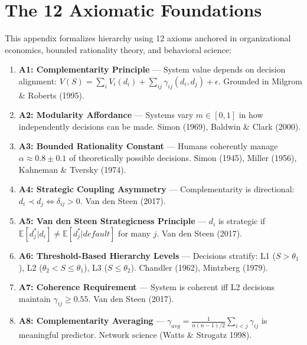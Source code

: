 
\section{The 12 Axiomatic Foundations}

This appendix formalizes hierarchy using 12 axioms anchored in organizational economics, bounded rationality theory, and behavioral science:

\begin{enumerate}

\item \textbf{A1: Complementarity Principle} — System value depends on decision alignment: $V(S) = \sum_i V_i(d_i) + \sum_{ij} \gamma_{ij}(d_i, d_j) + \epsilon$. Grounded in Milgrom \& Roberts (1995).

\item \textbf{A2: Modularity Affordance} — Systems vary $m \in [0,1]$ in how independently decisions can be made. Simon (1969), Baldwin \& Clark (2000).

\item \textbf{A3: Bounded Rationality Constant} — Humans coherently manage $\alpha \approx 0.8 \pm 0.1$ of theoretically possible decisions. Simon (1945), Miller (1956), Kahneman \& Tversky (1974).

\item \textbf{A4: Strategic Coupling Asymmetry} — Complementarity is directional: $d_i \prec d_j \Leftrightarrow \delta_{ij} > 0$. Van den Steen (2017).

\item \textbf{A5: Van den Steen Strategicness Principle} — $d_i$ is strategic if $\mathbb{E}[d_j^*|d_i] \neq \mathbb{E}[d_j^*|default]$ for many $j$. Van den Steen (2017).

\item \textbf{A6: Threshold-Based Hierarchy Levels} — Decisions stratify: L1 ($S > \theta_1$), L2 ($\theta_2 < S \leq \theta_1$), L3 ($S \leq \theta_2$). Chandler (1962), Mintzberg (1979).

\item \textbf{A7: Coherence Requirement} — System is coherent iff L2 decisions maintain $\gamma_{ij} \geq 0.55$. Van den Steen (2017).

\item \textbf{A8: Complementarity Averaging} — $\gamma_{avg} = \frac{1}{n(n-1)/2} \sum_{i<j} \gamma_{ij}$ is meaningful predictor. Network science (Watts \& Strogatz 1998).


\end{enumerate}
